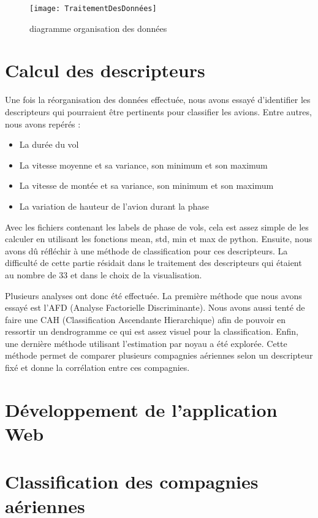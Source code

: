\begin{figure}[!h]
	\centering
	\texttt{[image: TraitementDesDonnées]}
	\caption{diagramme organisation des données}
	\label{fig:traitement_donnees}
\end{figure}


\section*{Calcul des descripteurs}

Une fois la réorganisation des données effectuée, nous avons essayé d'identifier les descripteurs qui pourraient être pertinents pour classifier les avions. Entre autres, nous avons repérés : 

\begin{itemize}
	\item La durée du vol
	\item La vitesse moyenne et sa variance, son minimum et son maximum
	\item La vitesse de montée et sa variance, son minimum et son maximum
	\item La variation de hauteur de l'avion durant la phase
\end{itemize}

Avec les fichiers contenant les labels de phase de vols, cela est assez simple de les calculer en utilisant les fonctions mean, std, min et max de python. Ensuite, nous avons dû réfléchir à une méthode de classification pour ces descripteurs. La difficulté de cette partie résidait dans le traitement des descripteurs qui étaient au nombre de 33 et dans le choix de la visualisation.

Plusieurs analyses ont donc été effectuée. La première méthode que nous avons essayé est l'AFD (Analyse Factorielle Discriminante). Nous avons aussi tenté de faire une CAH (Classification Ascendante Hierarchique) afin de pouvoir en ressortir un dendrogramme ce qui est assez visuel pour la classification. Enfin, une dernière méthode utilisant l'estimation par noyau a été explorée. Cette méthode permet de comparer plusieurs compagnies aériennes selon un descripteur fixé et donne la corrélation entre ces compagnies. 

\section*{Développement de l'application Web}

\section*{Classification des compagnies aériennes}
